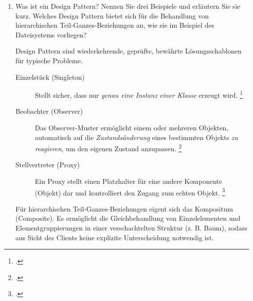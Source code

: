 \documentclass{lehramt-informatik-aufgabe}
\begin{document}
\begin{enumerate}

\item Was ist ein Design Pattern? Nennen Sie drei Beispiele und
erläutern Sie sie kurz. Welches Design Pattern bietet sich für die
Behandlung von hierarchischen Teil-Ganzes-Beziehungen an, wie sie im
Beispiel des Dateisystems vorliegen?

\begin{liAntwort}
Design Pattern sind wiederkehrende, geprüfte, bewährte Lösungsschablonen
für typische Probleme.


\begin{description}
\item[Einzelstück (Singleton)]
Stellt sicher, dass nur \emph{genau eine Instanz einer Klasse} erzeugt
wird.
\footcite[Seite 38]{eilebrecht}

\item[Beobachter (Observer)]
Das Observer-Muster ermöglicht einem oder mehreren Objekten, automatisch
auf die \emph{Zustandsänderung} eines bestimmten Objekts \emph{zu
reagieren}, um den eigenen Zustand anzupassen.
\footcite[Seite 70]{eilebrecht}

\item[Stellvertreter (Proxy)]
Ein Proxy stellt einen Platzhalter für eine andere Komponente (Objekt)
dar und kontrolliert den Zugang zum echten Objekt.
\footcite[Seite 89]{eilebrecht}
\end{description}

Für hierarchischen Teil-Ganzes-Beziehungen eigent sich das Kompositum
(Composite). Es ermöglicht die Gleichbehandlung von Einzelelementen und
Elementgruppierungen in einer verschachtelten Struktur (z. B. Baum),
sodass aus Sicht des Clients keine explizite Unterscheidung notwendig
ist.
\end{liAntwort}
\end{enumerate}

\begin{liAdditum}

\end{liAdditum}
\end{document}
